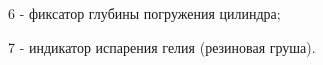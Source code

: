 \documentclass[12pt,a4paper]{article}
\begin{document}
 6 - фиксатор глубины погружения цилиндра;
 
 7 - индикатор испарения гелия (резиновая груша).


\begin{figure}[H]
    \begin{minipage}[h]{0.5\linewidth}
    \end{minipage}
    \hfill
    \begin{minipage}[h]{0.5\linewidth}

\end{minipage}
\end{figure}
\end{document}
